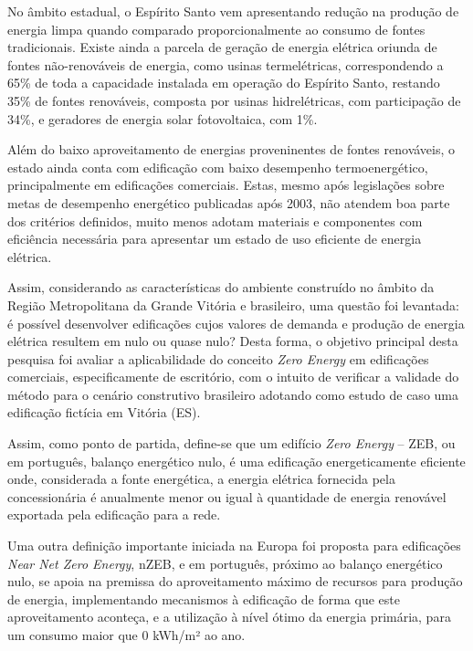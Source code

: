 \begin{onehalfspace}
    \noindent No âmbito estadual, o Espírito Santo vem apresentando redução na produção 
    de energia limpa quando comparado proporcionalmente ao consumo de fontes tradicionais. 
    Existe ainda a parcela de geração de energia elétrica oriunda de fontes não-renováveis 
    de energia, como usinas termelétricas, correspondendo a 65\% de toda a capacidade 
    instalada em operação do Espírito Santo, restando 35\% de fontes renováveis, composta 
    por usinas hidrelétricas, com participação de 34\%, e geradores de energia solar 
    fotovoltaica, com 1\%.\vspace*{0.3cm}

    \noindent Além do baixo aproveitamento de energias proveninentes de fontes renováveis,
    o estado ainda conta com edificação com baixo desempenho termoenergético, principalmente
    em edificações comerciais. Estas, mesmo após legislações sobre metas de desempenho 
    energético publicadas após 2003, não atendem boa parte dos critérios definidos, muito
    menos adotam materiais e componentes com eficiência necessária para apresentar um estado
    de uso eficiente de energia elétrica.\vspace*{0.3cm}

    \noindent Assim, considerando as características do ambiente construído no âmbito da 
    Região Metropolitana da Grande Vitória e brasileiro, uma questão foi levantada: 
    é possível desenvolver edificações cujos valores de demanda e produção de energia 
    elétrica resultem em nulo ou quase nulo? Desta forma, o objetivo principal desta pesquisa 
    foi avaliar a aplicabilidade do conceito \textit{Zero Energy} em edificações 
    comerciais, especificamente de escritório, com o intuito de verificar a validade do 
    método para o cenário construtivo brasileiro adotando como estudo de caso uma 
    edificação fictícia em Vitória (ES).\vspace*{0.3cm}

    \noindent Assim, como ponto de partida, define-se que um edifício 
    \textit{Zero Energy} – ZEB, ou em português, balanço energético nulo, é uma 
    edificação energeticamente eficiente onde, considerada a fonte energética, a 
    energia elétrica fornecida pela concessionária é anualmente menor ou igual à 
    quantidade de energia renovável exportada pela edificação para a rede.\vspace*{0.3cm}

    \noindent Uma outra definição importante iniciada na Europa foi proposta para 
    edificações \textit{Near Net Zero Energy}, nZEB, e em português, próximo ao 
    balanço energético nulo, se apoia na premissa do aproveitamento máximo 
    de recursos para produção de energia, implementando mecanismos à edificação de 
    forma que este aproveitamento aconteça, e a utilização à nível ótimo da energia 
    primária, para um consumo maior que 0 kWh/m² ao ano.\vspace*{0.3cm}


\end{onehalfspace}
